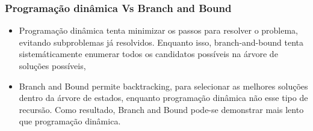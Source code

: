     \subsubsection{Programação dinâmica Vs Branch and Bound}

    \begin{itemize}
        \item Programação dinâmica tenta minimizar os passos para resolver 
        o problema, evitando subproblemas já resolvidos. Enquanto isso, 
        branch-and-bound tenta sistemáticamente enumerar todos os candidatos 
        possíveis na árvore de soluções possíveis,
        \item Branch and Bound permite backtracking, para selecionar as melhores 
        soluções dentro da árvore de estados, enquanto programação dinâmica não 
        esse tipo de recursão. Como resultado, Branch and Bound pode-se demonstrar 
        mais lento que programação dinâmica.
    \end{itemize}

    \nocite{dynamic-programming}

\newpage